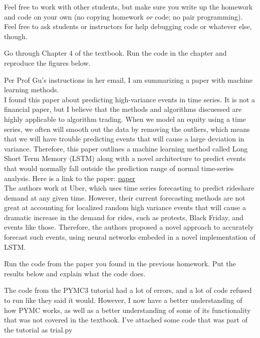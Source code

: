 \documentclass[12pt,letterpaper]{pset}
\begin{document}
Feel free to work with other students, but make sure you write up the homework
and code on your own (no copying homework \textit{or} code; no pair programming).
Feel free to ask students or instructors for help debugging code or whatever else,
though.\\

\begin{problem}[1]
  Go through Chapter 4 of the textbook. Run the code in the chapter and
  reproduce the figures below.
\end{problem}

\begin{solution}
Per Prof Gu's instructions in her email, I am summarizing a paper with machine learning methods. \\
I found this paper about predicting high-variance events in time series. It is not a financial paper, but I believe that the methods and algorithms discuessed are highly applicable to algorithm trading. When we model an equity using a time series, we often will smooth out the data by removing the outliers, which means that we will have trouble predicting events that will cause a large deviation in variance. Therefore, this paper outlines a machine learning method called Long Short Term Memory (LSTM) along with a novel architecture to predict events that would normally fall outside the prediction range of normal time-series analysis. Here is a link to the paper: \href{http://roseyu.com/time-series-workshop/submissions/TSW2017_paper_3.pdf} {paper}\\
 The authors work at Uber, which uses time series forecasting to predict rideshare demand at any given time. However, their current forecasting methods are not great at accounting for localized random high variance events that will cause a dramatic increase in the demand for rides, such as protests, Black Friday, and events like those. Therefore, the authors proposed a novel approach to accurately forecast such events, using neural networks embeded in a novel implementation of LSTM. 
\end{solution}

\newpage

\begin{problem}[2]
  Run the code from the paper you found in the previous homework. Put the
  results below and explain what the code does.
\end{problem}

\begin{solution}
    The code from the PYMC3 tutorial had a lot of errors, and a lot of code refused to run like they said it would. However, I now have a better understanding of how PYMC works, as well as a better understanding of some of its functionality that was not covered in the textbook. I've attached some code that was part of the tutorial as trial.py
\end{solution}

\newpage
\end{document}
